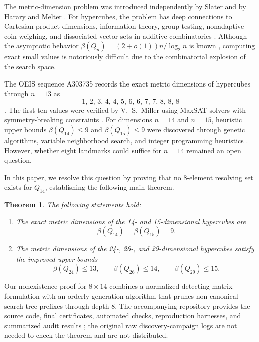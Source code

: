 \documentclass[11pt]{article}
\theoremstyle{plain}
\newtheorem{theorem}{Theorem}
\theoremstyle{definition}
\begin{document}
The metric-dimension problem was introduced independently by Slater \cite{slater1975} and by Harary and Melter \cite{harary1976}. For hypercubes, the problem has deep connections to Cartesian product dimensions, information theory, group testing, nonadaptive coin weighing, and dissociated vector sets in additive combinatorics \cite{caceres2007,cantormills1966,erdosrenyi1963,lindstrom1969,luye2022,sebotannier2004}. Although the asymptotic behavior $\beta(Q_n) = (2+o(1))n / \log_2 n$ is known \cite{erdosrenyi1963}, computing exact small values is notoriously difficult due to the combinatorial explosion of the search space.

The OEIS sequence A303735 records the exact metric dimensions of hypercubes through $n=13$ as
\[
  1,\, 2,\, 3,\, 4,\, 4,\, 5,\, 6,\, 6,\, 7,\, 7,\, 8,\, 8,\, 8
\]
\cite{oeisA303735}. The first ten values were verified by V.~S.~Miller using MaxSAT solvers with symmetry-breaking constraints \cite{oeisA303735}. For dimensions $n=14$ and $n=15$, heuristic upper bounds $\beta(Q_{14}) \le 9$ and $\beta(Q_{15}) \le 9$ were discovered through genetic algorithms, variable neighborhood search, and integer programming heuristics \cite{hertz2020,kratica2009,mladenovic2012,nikolic2017}. However, whether eight landmarks could suffice for $n=14$ remained an open question.

In this paper, we resolve this question by proving that no 8-element resolving set exists for $Q_{14}$, establishing the following main theorem.

\begin{theorem}\label{thm:main}
The following statements hold:
\begin{enumerate}[label=(\roman*)]
\item The exact metric dimensions of the 14- and 15-dimensional hypercubes are
\[
  \beta(Q_{14}) = \beta(Q_{15}) = 9.
\]
\item The metric dimensions of the 24-, 26-, and 29-dimensional hypercubes satisfy the improved upper bounds
\[
  \beta(Q_{24}) \le 13, \qquad
  \beta(Q_{26}) \le 14, \qquad
  \beta(Q_{29}) \le 15.
\]
\end{enumerate}
\end{theorem}

Our nonexistence proof for $8 \times 14$ combines a normalized detecting-matrix formulation with an orderly generation algorithm that prunes non-canonical search-tree prefixes through depth 8. The accompanying repository provides the source code, final certificates, automated checks, reproduction harnesses, and summarized audit results \cite{artifact}; the original raw discovery-campaign logs are not needed to check the theorem and are not distributed.
\end{document}
